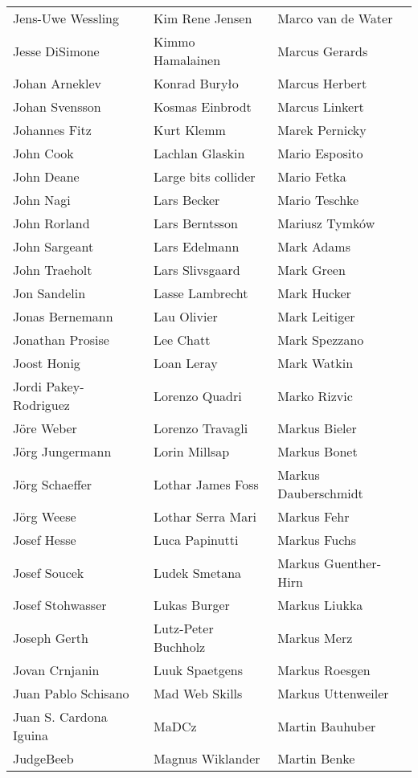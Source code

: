 \begin{tabular}{p{4.5cm}p{4.5cm}p{4.5cm}}
Jens-Uwe Wessling & Kim Rene Jensen & Marco van de Water \\
Jesse DiSimone & Kimmo Hamalainen & Marcus Gerards \\
Johan Arneklev & Konrad Buryło & Marcus Herbert \\
Johan Svensson & Kosmas Einbrodt & Marcus Linkert \\
Johannes Fitz & Kurt Klemm & Marek Pernicky \\
John Cook & Lachlan Glaskin & Mario Esposito \\
John Deane & Large bits collider & Mario Fetka \\
John Nagi & Lars Becker & Mario Teschke \\
John Rorland & Lars Berntsson & Mariusz Tymków \\
John Sargeant & Lars Edelmann & Mark Adams \\
John Traeholt & Lars Slivsgaard & Mark Green \\
Jon Sandelin & Lasse Lambrecht & Mark Hucker \\
Jonas Bernemann & Lau Olivier & Mark Leitiger \\
Jonathan Prosise & Lee Chatt & Mark Spezzano \\
Joost Honig & Loan Leray & Mark Watkin \\
Jordi Pakey-Rodriguez & Lorenzo Quadri & Marko Rizvic \\
Jöre Weber & Lorenzo Travagli & Markus Bieler \\
Jörg Jungermann & Lorin Millsap & Markus Bonet \\
Jörg Schaeffer & Lothar James Foss & Markus Dauberschmidt \\
Jörg Weese & Lothar Serra Mari & Markus Fehr \\
Josef Hesse & Luca Papinutti & Markus Fuchs \\
Josef Soucek & Ludek Smetana & Markus Guenther-Hirn \\
Josef Stohwasser & Lukas Burger & Markus Liukka \\
Joseph Gerth & Lutz-Peter Buchholz & Markus Merz \\
Jovan Crnjanin & Luuk Spaetgens & Markus Roesgen \\
Juan Pablo Schisano & Mad Web Skills & Markus Uttenweiler \\
Juan S. Cardona Iguina & MaDCz & Martin Bauhuber \\
JudgeBeeb & Magnus Wiklander & Martin Benke \\

\end{tabular}
